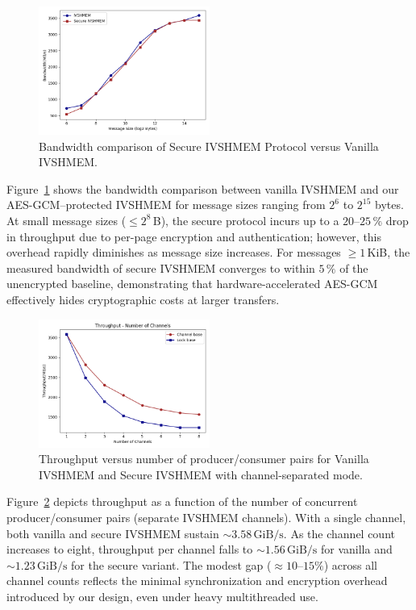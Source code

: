 \documentclass[conference]{IEEEtran}
\begin{document}
\begin{figure}[!h]
  \centering
  \includegraphics[width=0.5\textwidth]{figures/shm_basic.png}
  \caption{Bandwidth comparison of Secure IVSHMEM Protocol versus Vanilla IVSHMEM.}
  \label{fig:perf_bandwidth_overhead}
\end{figure}

Figure~\ref{fig:perf_bandwidth_overhead} shows the bandwidth comparison between vanilla IVSHMEM and our AES-GCM–protected IVSHMEM for message sizes ranging from $2^6$ to $2^{15}$ bytes. At small message sizes ($\leq 2^8\,$B), the secure protocol incurs up to a $20$--$25\,\%$ drop in throughput due to per-page encryption and authentication; however, this overhead rapidly diminishes as message size increases. For messages $\geq 1\,$KiB, the measured bandwidth of secure IVSHMEM converges to within $5\,\%$ of the unencrypted baseline, demonstrating that hardware-accelerated AES-GCM effectively hides cryptographic costs at larger transfers.

\begin{figure}[!h]
  \centering
  \includegraphics[width=0.5\textwidth]{figures/mpmc.png}
  \caption{Throughput versus number of producer/consumer pairs for Vanilla IVSHMEM and Secure IVSHMEM with channel-separated mode.}
  \label{fig:perf_mpmc}
\end{figure}

Figure~\ref{fig:perf_mpmc} depicts throughput as a function of the number of
concurrent producer/consumer pairs (separate IVSHMEM channels). With a single
channel, both vanilla and secure IVSHMEM sustain \(\sim3.58\,\mathrm{GiB}/\mathrm{s}\).
As the channel count increases to eight, throughput per channel falls to
\(\sim1.56\,\mathrm{GiB}/\mathrm{s}\) for vanilla and \(\sim1.23\,\mathrm{GiB}/\mathrm{s}\)
for the secure variant. The modest gap (\(\approx10\)–\(15\%\)) across all channel
counts reflects the minimal synchronization and encryption overhead introduced by
our design, even under heavy multithreaded use.
\end{document}
